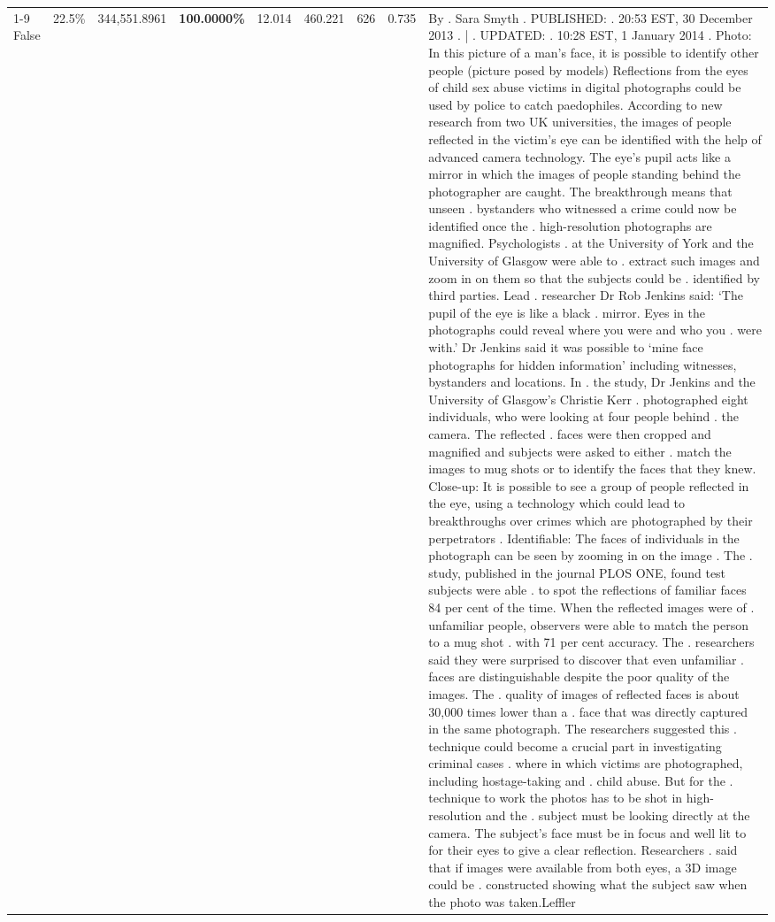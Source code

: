 \begin{table}[H]
\begin{tabular}{lllrlllll}
\cline{1-9}
False & 22.5\% & 344,551.8961 & \bfseries \color{red} 100.0000\% & 12.014 & 460.221 & 626 & 0.735 & By . Sara Smyth . PUBLISHED: . 20:53 EST, 30 December 2013 . | . UPDATED: . 10:28 EST, 1 January 2014 . Photo: In this picture of a man's face, it is possible to identify other people (picture posed by models) Reflections from the eyes of child sex abuse victims in digital photographs could be used by police to catch paedophiles. According to new research from two UK universities, the images of people reflected in the victim's eye can be identified with the help of advanced camera technology. The eye's pupil acts like a mirror in which the images of people standing behind the photographer are caught. The breakthrough means that unseen . bystanders who witnessed a crime could now be identified once the . high-resolution photographs are magnified. Psychologists . at the University of York and the University of Glasgow were able to . extract such images and zoom in on them so that the subjects could be . identified by third parties. Lead . researcher Dr Rob Jenkins said: ‘The pupil of the eye is like a black . mirror. Eyes in the photographs could reveal where you were and who you . were with.' Dr Jenkins said it was possible to ‘mine face photographs for hidden information' including witnesses, bystanders and locations. In . the study, Dr Jenkins and the University of Glasgow's Christie Kerr . photographed eight individuals, who were looking at four people behind . the camera. The reflected . faces were then cropped and magnified and subjects were asked to either . match the images to mug shots or to identify the faces that they knew. Close-up: It is possible to see a group of people reflected in the eye, using a technology which could lead to breakthroughs over crimes which are photographed by their perpetrators . Identifiable: The faces of individuals in the photograph can be seen by zooming in on the image . The . study, published in the journal PLOS ONE, found test subjects were able . to spot the reflections of familiar faces 84 per cent of the time. When the reflected images were of . unfamiliar people, observers were able to match the person to a mug shot . with 71 per cent accuracy. The . researchers said they were surprised to discover that even unfamiliar . faces are distinguishable despite the poor quality of the images. The . quality of images of reflected faces is about 30,000 times lower than a . face that was directly captured in the same photograph. The researchers suggested this . technique could become a crucial part in investigating criminal cases . where in which victims are photographed, including hostage-taking and . child abuse. But for the . technique to work the photos has to be shot in high-resolution and the . subject must be looking directly at the camera. The subject's face must be in focus and well lit to for their eyes to give a clear reflection. Researchers . said that if images were available from both eyes, a 3D image could be . constructed showing what the subject saw when the photo was taken.Leffler \\

\end{tabular}
\end{table}
